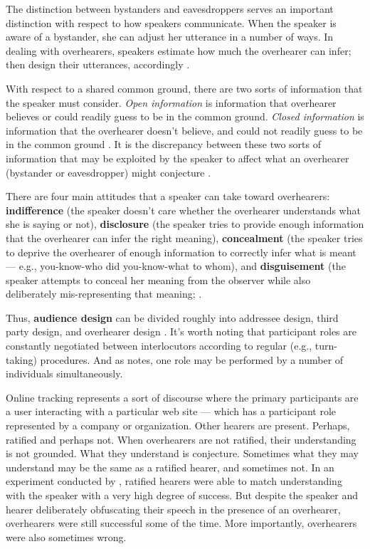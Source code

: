 \begin{sloppier}
The distinction between bystanders and eavesdroppers serves an important distinction with respect to how speakers communicate. When the speaker is aware of a bystander, she can adjust her utterance in a number of ways. In dealing with overhearers, speakers  estimate how much the overhearer can infer; then design their utterances, accordingly \citep{Clark:1992ty}. 
\end{sloppier}

With respect to a shared common ground, there are two sorts of information that the speaker must consider. \textit{Open information} is information that overhearer believes or could readily guess to be in the common ground. \textit{Closed information} is information that the overhearer doesn't believe, and could not readily guess to be in the common ground \citep{Clark:1992ty}. It is the discrepancy between these two sorts of information that may be exploited by the speaker to affect what an overhearer (bystander or eavesdropper) might conjecture \citep{Clark:1992ty}. 

\begin{sloppier}
There are four main attitudes that a speaker can take toward overhearers: \textbf{indifference} (the speaker doesn't care whether the overhearer understands what she is saying or not), \textbf{disclosure} (the speaker tries to provide enough information that the overhearer can infer the right meaning), \textbf{concealment} (the speaker tries to deprive the overhearer of enough information to correctly infer what is meant --- e.g., you-know-who did you-know-what to whom), and \textbf{disguisement} (the speaker attempts to conceal her meaning from the observer while also deliberately mis-representing that meaning; \citep{Clark:1992ty}. 

Thus, \textbf{audience design} can be divided roughly into addressee design, third party design, and overhearer design \citep{Clark:1982tg}. It's worth noting that participant roles are constantly negotiated between interlocutors according to regular (e.g., turn-taking) procedures. And as \cite{Dynel:2010th} notes, one role may be performed by a number of individuals simultaneously.
\end{sloppier}

Online tracking represents a sort of discourse where the primary participants are a user interacting with a particular web site --- which has a participant role represented by a company or organization. Other hearers are present. Perhaps, ratified and perhaps not. When overhearers are not ratified, their understanding is not grounded. What they understand is conjecture. Sometimes what they may understand may be the same as a ratified hearer, and sometimes not. In an experiment conducted by \cite{Schober:1989wn}, ratified hearers were able to match understanding with the speaker with a very high degree of success. But despite the speaker and hearer deliberately obfuscating their speech in the presence of an overhearer, overhearers were still successful some of the time. More importantly, overhearers were also sometimes wrong.


